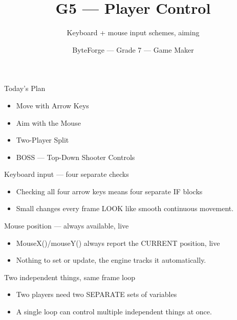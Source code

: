 \documentclass[aspectratio=169]{beamer}
\title{G5 — Player Control}
\subtitle{Keyboard + mouse input schemes, aiming}
\author{ByteForge --- Grade 7 --- Game Maker}
\date{}
\begin{document}
\begin{frame}
    \titlepage
\end{frame}

\begin{frame}{Today's Plan}
    \begin{itemize}
        \item Move with Arrow Keys
        \item Aim with the Mouse
        \item Two-Player Split
        \item[$\bigstar$] BOSS --- Top-Down Shooter Controls
    \end{itemize}
\end{frame}

\begin{frame}{Keyboard input — four separate checks}
    \large
    \begin{itemize}
        \item Checking all four arrow keys means four separate IF blocks
        \item Small changes every frame LOOK like smooth continuous movement.
    \end{itemize}
\end{frame}


\begin{frame}{Mouse position — always available, live}
    \large
    \begin{itemize}
        \item MouseX()/mouseY() always report the CURRENT position, live
        \item Nothing to set or update, the engine tracks it automatically.
    \end{itemize}

    \begin{center}
    \end{center}
\end{frame}


\begin{frame}{Two independent things, same frame loop}
    \large
    \begin{itemize}
        \item Two players need two SEPARATE sets of variables
        \item A single loop can control multiple independent things at once.
    \end{itemize}
\end{frame}
\end{document}
